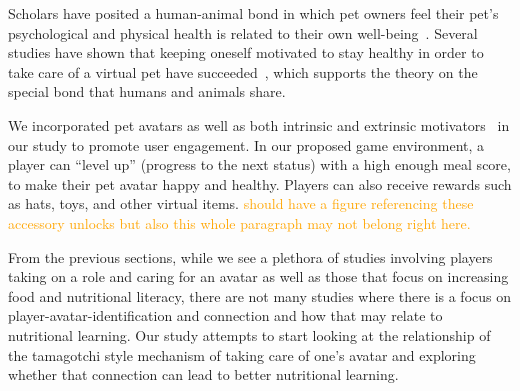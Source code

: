 

Scholars have posited a human-animal bond in which pet owners feel their pet's psychological and physical health is related to their own well-being~\cite{chesney2007illusion,hosey2014human,lin2017exploring,zichermann2011gamification}. Several studies have shown that keeping oneself motivated to stay healthy in order to take care of a virtual pet have succeeded~\cite{ahn2015using,byrne2012caring,lin2006fish,pollak2010s}, which supports the theory on the special bond that humans and animals share. 

We incorporated pet avatars as well as both intrinsic and extrinsic motivators~\cite{chen2016scaffolding,habgood2011motivating} in our study to promote user engagement.
In our proposed game environment, a player can ``level up'' (progress to the next status) with a high enough meal score, to make their pet avatar happy and healthy. Players can also receive rewards such as hats, toys, and other virtual items. \textcolor{orange}{should have a figure referencing these accessory unlocks but also this whole paragraph may not belong right here. }

From the previous sections, while we see a plethora of studies involving players taking on a role and caring for an avatar as well as those that focus on increasing food and nutritional literacy, there are not many studies where there is a focus on player-avatar-identification and connection and how that may relate to nutritional learning. Our study attempts to start looking at the relationship of the tamagotchi style mechanism of taking care of one's avatar and exploring whether that connection can lead to better nutritional learning. 

